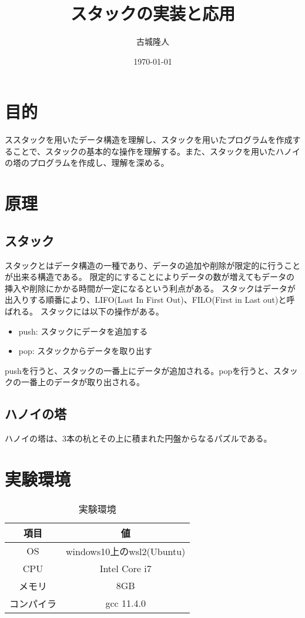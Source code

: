 \documentclass[a4paper,11pt]{jsarticle}
\begin{document}
\title{スタックの実装と応用}
\author{古城隆人}
\date{\today}
\maketitle

\newpage


\section{目的}
ススタックを用いたデータ構造を理解し、スタックを用いたプログラムを作成することで、スタックの基本的な操作を理解する。また、スタックを用いたハノイの塔のプログラムを作成し、理解を深める。
\section{原理}
\subsection{スタック}
スタックとはデータ構造の一種であり、データの追加や削除が限定的に行うことが出来る構造である。
限定的にすることによりデータの数が増えてもデータの挿入や削除にかかる時間が一定になるという利点がある。
スタックはデータが出入りする順番により、LIFO(Last In First Out)、FILO(First in Last out)と呼ばれる。
スタックには以下の操作がある。
\begin{itemize}
  \item push: スタックにデータを追加する
  \item pop: スタックからデータを取り出す
\end{itemize}
pushを行うと、スタックの一番上にデータが追加される。popを行うと、スタックの一番上のデータが取り出される。
\subsection{ハノイの塔}
ハノイの塔は、3本の杭とその上に積まれた円盤からなるパズルである。
\section{実験環境}
\begin{table}[ht]
  \centering
  \begin{tabular}{|c|c|}
    \hline
    \textbf{項目} & \textbf{値}              \\
    \hline
    OS          & windows10上のwsl2(Ubuntu) \\
    \hline
    CPU         & Intel Core i7           \\
    \hline
    メモリ         & 8GB                     \\
    \hline
    コンパイラ       & gcc 11.4.0              \\
    \hline
  \end{tabular}
  \caption{実験環境}
  \label{tab:environment}
\end{table}
\end{document}
